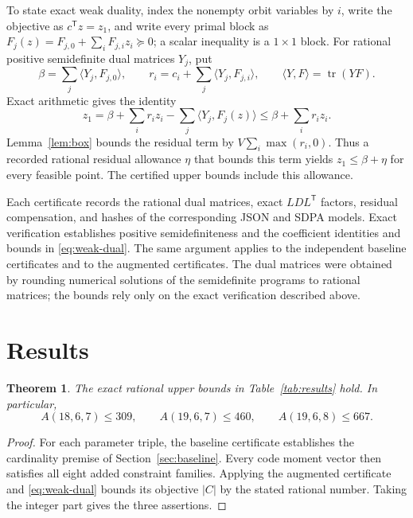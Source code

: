 \documentclass[11pt]{article}
\newtheorem{theorem}{Theorem}
\newcommand{\ip}[2]{\langle #1,#2\rangle}
\DeclareMathOperator{\tr}{tr}
\begin{document}
To state exact weak duality, index the nonempty orbit variables by $i$,
write the objective as $c^{\mathsf T}z=z_1$, and write every primal block as
$F_j(z)=F_{j,0}+\sum_iF_{j,i}z_i\succeq0$; a scalar inequality is a
$1\times1$ block. For rational positive semidefinite dual matrices $Y_j$, put
\[
 \beta=\sum_j\ip{Y_j}{F_{j,0}},\qquad
 r_i=c_i+\sum_j\ip{Y_j}{F_{j,i}},\qquad
 \ip{Y}{F}=\tr(YF).
\]
Exact arithmetic gives the identity
\begin{equation}\label{eq:weak-dual}
 z_1=\beta+\sum_i r_i z_i-\sum_j\ip{Y_j}{F_j(z)}
 \le\beta+\sum_i r_i z_i.
\end{equation}
Lemma~\ref{lem:box} bounds the residual term by
$V\sum_i\max(r_i,0)$. Thus a recorded rational residual allowance $\eta$
that bounds this term yields $z_1\le\beta+\eta$ for every feasible point.
The certified upper bounds include this allowance.

Each certificate records the rational dual matrices, exact
$LDL^{\mathsf T}$ factors, residual compensation, and hashes of the
corresponding JSON and SDPA models. Exact verification establishes positive
semidefiniteness and the coefficient identities and bounds in
\eqref{eq:weak-dual}. The same argument applies to the independent baseline
certificates and to the augmented certificates. The dual matrices were obtained by rounding numerical solutions of the semidefinite programs to rational matrices; the bounds rely only on the exact verification described above.

\section{Results}\label{sec:results}

\begin{theorem}
The exact rational upper bounds in Table~\ref{tab:results} hold. In particular,
\[
 \boxed{A(18,6,7)\le309,\qquad A(19,6,7)\le460,\qquad A(19,6,8)\le667.}
\]
\end{theorem}
\begin{proof}
For each parameter triple, the baseline certificate establishes the
cardinality premise of Section~\ref{sec:baseline}. Every code moment vector
then satisfies all eight added constraint families. Applying the augmented
certificate and \eqref{eq:weak-dual} bounds its objective $|C|$ by the stated
rational number. Taking the integer part gives the three assertions.
\end{proof}
\end{document}
